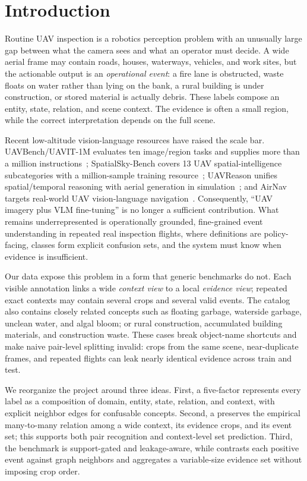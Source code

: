 \section{Introduction}
\label{sec:intro}

Routine UAV inspection is a robotics perception problem with an unusually large gap between what the camera sees and what an operator must decide. A wide aerial frame may contain roads, houses, waterways, vehicles, and work sites, but the actionable output is an \emph{operational event}: a fire lane is obstructed, waste floats on water rather than lying on the bank, a rural building is under construction, or stored material is actually debris. These labels compose an entity, state, relation, and scene context. The evidence is often a small region, while the correct interpretation depends on the full scene.

Recent low-altitude vision-language resources have raised the scale bar. UAVBench/UAVIT-1M evaluates ten image/region tasks and supplies more than a million instructions~\cite{zhan2026uavbench}; SpatialSky-Bench covers 13 UAV spatial-intelligence subcategories with a million-sample training resource~\cite{zhang2026spatialsky}; UAVReason unifies spatial/temporal reasoning with aerial generation in simulation~\cite{sun2026uavreason}; and AirNav targets real-world UAV vision-language navigation~\cite{cai2026airnav}. Consequently, ``UAV imagery plus VLM fine-tuning'' is no longer a sufficient contribution. What remains underrepresented is operationally grounded, fine-grained event understanding in repeated real inspection flights, where definitions are policy-facing, classes form explicit confusion sets, and the system must know when evidence is insufficient.

Our data expose this problem in a form that generic benchmarks do not. Each visible annotation links a wide \emph{context view} to a local \emph{evidence view}; repeated exact contexts may contain several crops and several valid events. The catalog also contains closely related concepts such as floating garbage, waterside garbage, unclean water, and algal bloom; or rural construction, accumulated building materials, and construction waste. These cases break object-name shortcuts and make naive pair-level splitting invalid: crops from the same scene, near-duplicate frames, and repeated flights can leak nearly identical evidence across train and test.



We reorganize the project around three ideas. First, a five-factor \eventgraph represents every label as a composition of domain, entity, state, relation, and context, with explicit neighbor edges for confusable concepts. Second, a \samplegraph preserves the empirical many-to-many relation among a wide context, its evidence crops, and its event set; this supports both pair recognition and context-level set prediction. Third, the benchmark is support-gated and leakage-aware, while \method contrasts each positive event against graph neighbors and aggregates a variable-size evidence set without imposing crop order.

